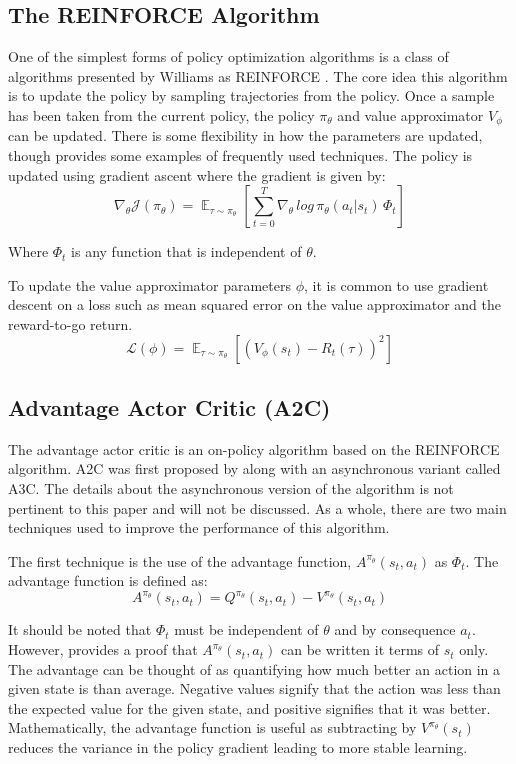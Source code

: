 \documentclass[conference]{IEEEtran}
\begin{document}
\subsection{The REINFORCE Algorithm}

One of the simplest forms of policy optimization algorithms is a class of algorithms presented by Williams as REINFORCE \cite{REINFORCE}. The core idea this algorithm is to update the policy by sampling trajectories from the policy. Once a sample has been taken from the current policy, the policy $\pi_\theta$ and value approximator $V_\phi$ can be updated. There is some flexibility in how the parameters are updated, though \cite{spinning_up_policy_optimization} provides some examples of frequently used techniques. The policy is updated using gradient ascent where the gradient is given by:
$$
    \nabla_\theta\mathcal{J(\pi_\theta)} = \mathop{\mathbb{E}}_{\tau \sim \pi_\theta} \left[\sum_{t=0}^{T}\nabla_\theta \, log \, \pi_\theta(a_t | s_t) \, \Phi_t \right]
$$
\begin{flushleft}
    Where $\Phi_t$ is any function that is independent of $\theta$.
\end{flushleft}


To update the value approximator parameters $\phi$, it is common to use gradient descent on a loss such as mean squared error on the value approximator and the reward-to-go return.
$$
    \mathcal{L}(\phi) = \mathop{\mathbb{E}}_{\tau \sim \pi_\theta} \left[\left(V_\phi(s_t) - R_t(\tau)\right)^2\right]
$$

\subsection{Advantage Actor Critic (A2C)}

The advantage actor critic is an on-policy algorithm based on the REINFORCE algorithm. A2C was first proposed by \cite{A2C} along with an asynchronous variant called A3C. The details about the asynchronous version of the algorithm is not pertinent to this paper and will not be discussed. As a whole, there are two main techniques used to improve the performance of this algorithm.

The first technique is the use of the advantage function, $A^{\pi_\theta}(s_t, a_t)$ as $\Phi_t$. The advantage function is defined as:
$$
    A^{\pi_\theta}(s_t, a_t) = Q^{\pi_\theta}(s_t, a_t) - V^{\pi_\theta}(s_t, a_t)
$$

It should be noted that $\Phi_t$ must be independent of $\theta$ and by consequence $a_t$. However, \cite{spinning_up_policy_optimization} provides a proof that $A^{\pi_\theta}(s_t, a_t)$ can be written it terms of $s_t$ only. The advantage can be thought of as quantifying how much better an action in a given state is than average. Negative values signify that the action was less than the expected value for the given state, and positive signifies that it was better. Mathematically, the advantage function is useful as subtracting by $V^{\pi_\theta}(s_t)$ reduces the variance in the policy gradient leading to more stable learning.
\end{document}
